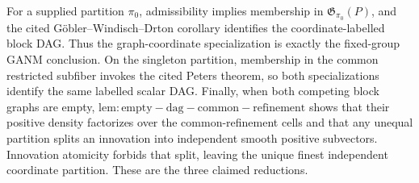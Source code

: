 For a supplied partition \(\pi_0\), admissibility implies membership in \(\mathfrak G_{\pi_0}(P)\), and the cited Göbler--Windisch--Drton corollary identifies the coordinate-labelled block DAG.  Thus the graph-coordinate specialization is exactly the fixed-group GANM conclusion.  On the singleton partition, membership in the common restricted subfiber invokes the cited Peters theorem, so both specializations identify the same labelled scalar DAG.  Finally, when both competing block graphs are empty, \(\mathrm{lem:empty-dag-common-refinement}\) shows that their positive density factorizes over the common-refinement cells and that any unequal partition splits an innovation into independent smooth positive subvectors.  Innovation atomicity forbids that split, leaving the unique finest independent coordinate partition.  These are the three claimed reductions.